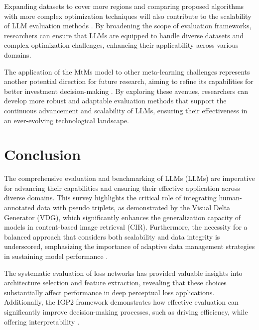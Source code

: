 Expanding datasets to cover more regions and comparing proposed algorithms with more complex optimization techniques will also contribute to the scalability of LLM evaluation methods \cite{woszczyk2018maasimliveabilitysimulationimproving}. By broadening the scope of evaluation frameworks, researchers can ensure that LLMs are equipped to handle diverse datasets and complex optimization challenges, enhancing their applicability across various domains.



The application of the MtMs model to other meta-learning challenges represents another potential direction for future research, aiming to refine its capabilities for better investment decision-making \cite{stank2024designingtimeseriesmodelshypernetworks}. By exploring these avenues, researchers can develop more robust and adaptable evaluation methods that support the continuous advancement and scalability of LLMs, ensuring their effectiveness in an ever-evolving technological landscape.











\section{Conclusion} \label{sec:Conclusion}







The comprehensive evaluation and benchmarking of LLMs (LLMs) are imperative for advancing their capabilities and ensuring their effective application across diverse domains. This survey highlights the critical role of integrating human-annotated data with pseudo triplets, as demonstrated by the Visual Delta Generator (VDG), which significantly enhances the generalization capacity of models in content-based image retrieval (CIR). Furthermore, the necessity for a balanced approach that considers both scalability and data integrity is underscored, emphasizing the importance of adaptive data management strategies in sustaining model performance \cite{shanks2004speculationgraphcomputationarchitectures}.



The systematic evaluation of loss networks has provided valuable insights into architecture selection and feature extraction, revealing that these choices substantially affect performance in deep perceptual loss applications. Additionally, the IGP2 framework demonstrates how effective evaluation can significantly improve decision-making processes, such as driving efficiency, while offering interpretability \cite{albrecht2021interpretablegoalbasedpredictionplanning}. 



